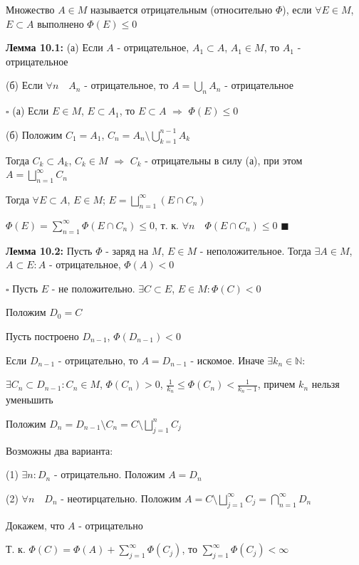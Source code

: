 \documentclass[a4paper]{report}
\begin{document}
Множество $A\in M$ называется отрицательным (относительно $\Phi$), если $\forall E\in M$, $E\subset A$ выполнено $\Phi(E)\le0$
\bigskip

\noindent\textbf{Лемма 10.1:} (а) Если $A$ - отрицательное, $A_1\subset A$, $A_1\in M$, то $A_1$ - отрицательное

(б) Если $\forall n\quad A_n$ - отрицательное, то $A=\bigcup\limits_n A_n$ - отрицательное

\noindent $\square$ (а) Если $E\in M$, $E\subset A_1$, то $E\subset A$ $\Rightarrow$ $\Phi(E)\le0$

(б) Положим $C_1=A_1$, $C_n=A_n\setminus\bigcup\limits_{k=1}^{n-1}A_k$

Тогда $C_k\subset A_k$, $C_k\in M$ $\Rightarrow$ $C_k$ - отрицательны в силу (а), при этом $A=\bigsqcup\limits_{n=1}^\infty C_n$

Тогда $\forall E\subset A$, $E\in M$; $E=\bigsqcup\limits_{n=1}^\infty(E\cap C_n)$

$\Phi(E)=\sum\limits_{n=1}^\infty\Phi(E\cap C_n)\le0$, т. к. $\forall n\quad\Phi(E\cap C_n)\le0$ $\blacksquare$
\bigskip

\noindent\textbf{Лемма 10.2:} Пусть $\Phi$ - заряд на $M$, $E\in M$ - неположительное. Тогда $\exists A\in M$, $A\subset E\colon A$ - отрицательное, $\Phi(A)<0$

\noindent $\square$ Пусть $E$ - не положительно. $\exists C\subset E$, $E\in M\colon\Phi(C)<0$

Положим $D_0=C$

Пусть построено $D_{n-1}$, $\Phi(D_{n-1})<0$

Если $D_{n-1}$ - отрицательно, то $A=D_{n-1}$ - искомое. Иначе $\exists k_n\in\mathbb N\colon$

\noindent$\exists C_n\subset D_{n-1}\colon C_n\in M$, $\Phi(C_n)>0$, $\displaystyle\frac{1}{k_n}\le\Phi(C_n)<\displaystyle\frac{1}{k_n-1}$, причем $k_n$ нельзя уменьшить

Положим $D_n=D_{n-1}\setminus C_n=C\setminus\bigsqcup\limits_{j=1}^n C_j$

Возможны два варианта:

(1) $\exists n\colon D_n$ - отрицательно. Положим $A=D_n$

(2) $\forall n\quad D_n$ - неотирцательно. Положим $A=C\setminus\bigsqcup\limits_{j=1}^\infty C_j=\bigcap\limits_{n=1}^\infty D_n$

Докажем, что $A$ - отрицательно

Т. к. $\Phi(C)=\Phi(A)+\sum\limits_{j=1}^\infty\Phi(C_j)$, то $\sum\limits_{j=1}^\infty\Phi(C_j)<\infty$
\end{document}
